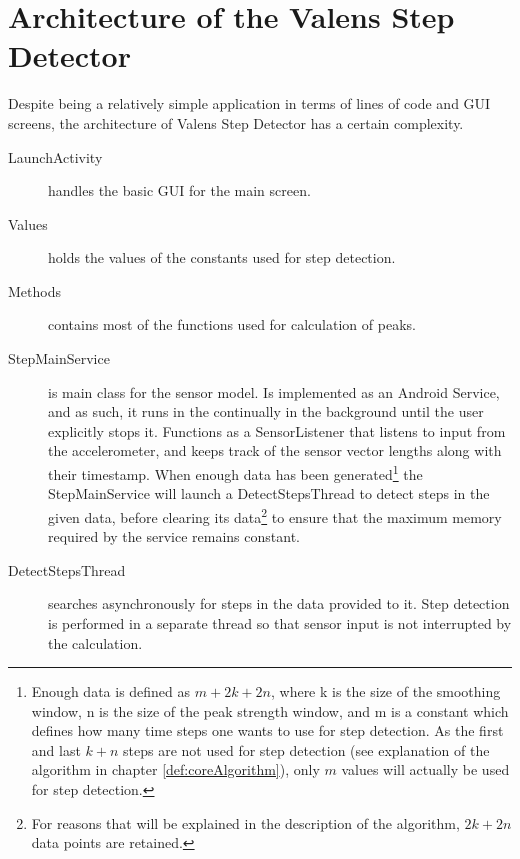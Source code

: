 

\section{Architecture of the Valens Step Detector}

Despite being a relatively simple application in terms of lines of code and GUI screens, the architecture of Valens Step Detector has a certain complexity.

\begin{description}

\item[LaunchActivity]
handles the basic GUI for the main screen.

\item[Values]
holds the values of the constants used for step detection.

\item[Methods]
contains most of the functions used for calculation of peaks.

\item[StepMainService]
is main class for the sensor model. Is implemented as an Android Service, and as such, it runs in the continually in the background until the user explicitly stops it. Functions as a SensorListener that listens to input from the accelerometer, and keeps track of the sensor vector lengths along with their timestamp. When enough data has been generated\footnote{Enough data is defined as $m+2k+2n$, where k is the size of the smoothing window, n is the size of the peak strength window, and m is a constant which defines how many time steps one wants to use for step detection. As the first and last $k+n$ steps are not used for step detection (see explanation of the algorithm in chapter \ref{def:coreAlgorithm}), only $m$ values will actually be used for step detection.} the StepMainService will launch a DetectStepsThread to detect steps in the given data, before clearing its data\footnote{For reasons that will be explained in the description of the algorithm, $2k+2n$ data points are retained.} to ensure that the maximum memory required by the service remains constant. 

\item[DetectStepsThread]
searches asynchronously for steps in the data provided to it. Step detection is performed in a separate thread so that sensor input is not interrupted by the calculation.


\end{description}
